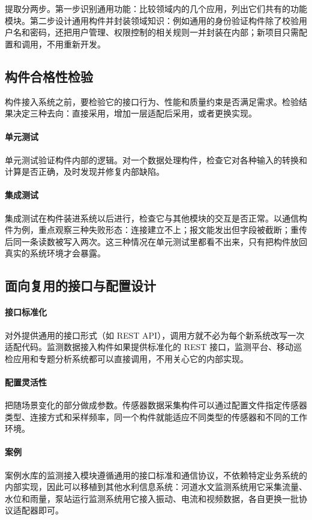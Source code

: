 提取分两步。第一步识别通用功能：比较领域内的几个应用，列出它们共有的功能模块。第二步设计通用构件并封装领域知识：例如通用的身份验证构件除了校验用户名和密码，还把用户管理、权限控制的相关规则一并封装在内部；新项目只需配置和调用，不用重新开发。

\subsection{构件合格性检验}

构件接入系统之前，要检验它的接口行为、性能和质量约束是否满足需求。检验结果决定三种去向：直接采用，增加一层适配后采用，或者更换实现。

\paragraph{单元测试}单元测试验证构件内部的逻辑。对一个数据处理构件，检查它对各种输入的转换和计算是否正确，及时发现并修复内部缺陷。

\paragraph{集成测试}集成测试在构件装进系统以后进行，检查它与其他模块的交互是否正常。以通信构件为例，重点观察三种失败形态：连接建立不上；报文能发出但字段被截断；重传后同一条读数被写入两次。这三种情况在单元测试里都看不出来，只有把构件放回真实的系统环境才会暴露。

\subsection{面向复用的接口与配置设计}

\paragraph{接口标准化}对外提供通用的接口形式（如 REST API），调用方就不必为每个新系统改写一次适配代码。监测数据接入构件如果提供标准化的 REST 接口，监测平台、移动巡检应用和专题分析系统都可以直接调用，不用关心它的内部实现。

\paragraph{配置灵活性}把随场景变化的部分做成参数。传感器数据采集构件可以通过配置文件指定传感器类型、连接方式和采样频率，同一个构件就能适应不同类型的传感器和不同的工作环境。

\paragraph{案例}案例水库的监测接入模块遵循通用的接口标准和通信协议，不依赖特定业务系统的内部实现，因此可以移植到其他水利信息系统：河道水文监测系统用它采集流量、水位和雨量，泵站运行监测系统用它接入振动、电流和视频数据，各自更换一批协议适配器即可。



